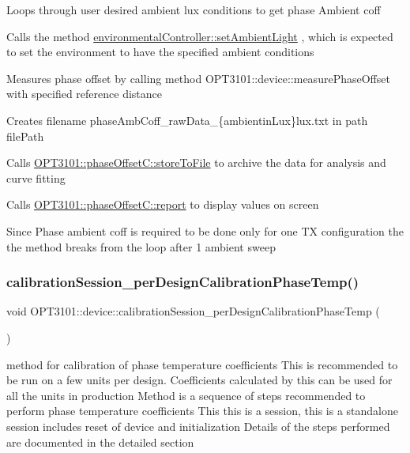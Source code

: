\begin{DoxyItemize}
\item Loops through user desired ambient lux conditions to get phase Ambient coff
\item Calls the method \mbox{\hyperlink{classenvironmental_controller_adc63a8d9dbdbcef5768cf34692c6465c}{environmental\+Controller\+::set\+Ambient\+Light}} , which is expected to set the environment to have the specified ambient conditions
\item Measures phase offset by calling method O\+P\+T3101\+::device\+::measure\+Phase\+Offset with specified reference distance
\item Creates filename phase\+Amb\+Coff\+\_\+raw\+Data\+\_\+\{ambientin\+Lux\}lux.\+txt in path file\+Path
\item Calls \mbox{\hyperlink{class_o_p_t3101_1_1phase_offset_c_ae542e328ed54d6e791c1350d878d1dd0}{O\+P\+T3101\+::phase\+Offset\+C\+::store\+To\+File}} to archive the data for analysis and curve fitting
\item Calls \mbox{\hyperlink{class_o_p_t3101_1_1phase_offset_c_a6baba22699fdb39d45adfd104a44534c}{O\+P\+T3101\+::phase\+Offset\+C\+::report}} to display values on screen
\item Since Phase ambient coff is required to be done only for one TX configuration the the method breaks from the loop after 1 ambient sweep 
\end{DoxyItemize}\mbox{\label{class_o_p_t3101_1_1device_aec05fdf2f9780dea74305720ccb1cf32}} 
\subsubsection{\texorpdfstring{calibration\+Session\+\_\+per\+Design\+Calibration\+Phase\+Temp()}{calibrationSession\_perDesignCalibrationPhaseTemp()}}
{\footnotesize\ttfamily void O\+P\+T3101\+::device\+::calibration\+Session\+\_\+per\+Design\+Calibration\+Phase\+Temp (\begin{DoxyParamCaption}{ }\end{DoxyParamCaption})}



method for calibration of phase temperature coefficients This is recommended to be run on a few units per design. Coefficients calculated by this can be used for all the units in production Method is a sequence of steps recommended to perform phase temperature coefficients This this is a session, this is a standalone session includes reset of device and initialization Details of the steps performed are documented in the detailed section 

